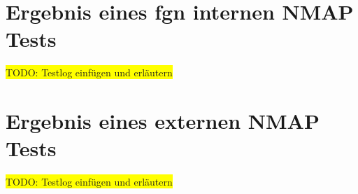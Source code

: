 \documentclass[11pt,a4paper,titlepage=firstiscover,headsepline,bibtotoc]{scrartcl} %
\newcommand{\hilight}[1]{\colorbox{yellow}{#1}} %
\begin{document}
\newpage
\section{Ergebnis eines fgn internen NMAP Tests}\label{sec:NMAP-Test-int}
\hilight{TODO: Testlog einfügen und erläutern}
\newpage
\section{Ergebnis eines externen NMAP Tests}\label{sec:NMAP-Test-ext}
\hilight{TODO: Testlog einfügen und erläutern}
\newpage

%
%
\end{document}
